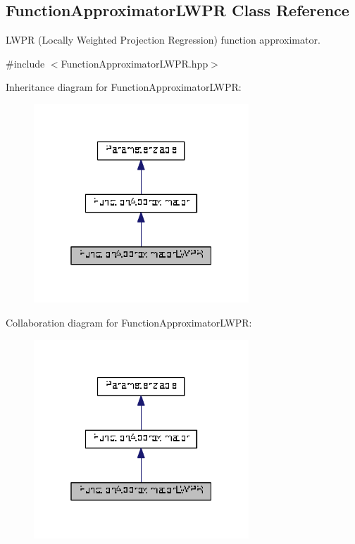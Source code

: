 \hypertarget{classDmpBbo_1_1FunctionApproximatorLWPR}{\subsection{Function\+Approximator\+L\+W\+P\+R Class Reference}
\label{classDmpBbo_1_1FunctionApproximatorLWPR}
}


L\+W\+P\+R (Locally Weighted Projection Regression) function approximator.  




{\ttfamily \#include $<$Function\+Approximator\+L\+W\+P\+R.\+hpp$>$}



Inheritance diagram for Function\+Approximator\+L\+W\+P\+R\+:
\nopagebreak
\begin{figure}[H]
\begin{center}
\leavevmode
\includegraphics[width=229pt]{classDmpBbo_1_1FunctionApproximatorLWPR__inherit__graph}
\end{center}
\end{figure}


Collaboration diagram for Function\+Approximator\+L\+W\+P\+R\+:
\nopagebreak
\begin{figure}[H]
\begin{center}
\leavevmode
\includegraphics[width=229pt]{classDmpBbo_1_1FunctionApproximatorLWPR__coll__graph}
\end{center}
\end{figure}
